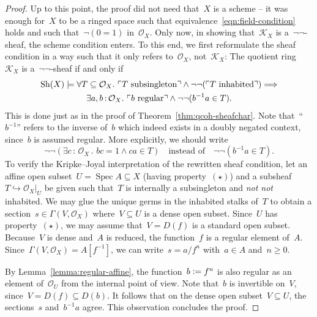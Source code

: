 \documentclass[10pt]{amsart}
\theoremstyle{definition}
\theoremstyle{plain}
\theoremstyle{remark}
\renewcommand{\O}{\mathcal{O}}
\newcommand{\K}{\mathcal{K}}
\newcommand{\Sh}{\mathrm{Sh}}
\DeclareMathOperator{\Spec}{Spec}
\newcommand{\?}{\,{:}\,}
\renewcommand{\_}{\mathpunct{.}\,}
\newcommand{\speak}[1]{\ulcorner\text{\textnormal{#1}}\urcorner}
\newcommand{\notnot}{\emph{not not}\xspace}
\newcommand{\defeq}{\vcentcolon=}
\begin{document}
\begin{proof}
Up to this point, the proof did not need that~$X$ is a scheme -- it was enough
for~$X$ to be a ringed space such that equivalence~\eqref{eqn:field-condition} holds and
such that~$\neg(0 = 1)$ in~$\O_X$. Only now, in showing that~$\K_X$ is
a~$\neg\neg$-sheaf, the scheme condition enters. To this end, we first
reformulate the sheaf condition in a way such that it only refers to~$\O_X$,
not~$\K_X$: The quotient ring~$\K_X$ is a~$\neg\neg$-sheaf if and only if
\begin{multline*}
  \Sh(X) \models \forall T \subseteq \O_X\_
  \speak{$T$ subsingleton} \wedge \neg\neg(\speak{$T$ inhabited})
  \Longrightarrow \\
  \exists a,b\?\O_X\_ \speak{$b$ regular} \wedge \neg\neg(b^{-1} a \in T).
\end{multline*}
This is done just as in the proof of Theorem~\ref{thm:qcoh-sheafchar}. Note
that~``$b^{-1}$'' refers to the inverse of~$b$ which indeed exists in a doubly
negated context, since~$b$ is assumed regular. More explicitly, we should write
\[ \neg\neg(\exists c\?\O_X\_ bc = 1 \wedge ca \in T)
  \quad\text{instead of}\quad
  \neg\neg(b^{-1} a \in T). \]
To verify the Kripke--Joyal interpretation of the rewritten sheaf condition, let
an affine open subset~$U = \Spec A \subseteq X$ (having property~$(\star)$) and a subsheaf~$T
\hookrightarrow \O_X|_U$ be given such that~$T$ is internally a subsingleton
and \notnot inhabited. We may glue the unique germs in the inhabited
stalks of~$T$ to obtain a section~$s \in \Gamma(V,\O_X)$ where~$V \subseteq U$
is a dense open subset. Since~$U$ has property~$(\star)$, we may assume that~$V
= D(f)$ is a standard open subset. Because~$V$ is dense and~$A$ is reduced, the
function~$f$ is a regular element of~$A$.
Since~$\Gamma(V,\O_X) = A[f^{-1}]$, we can write~$s = a/f^n$ with~$a \in A$
and~$n \geq 0$.

By Lemma~\ref{lemma:regular-affine}, the function~$b \defeq f^n$ is also regular as an
element of~$\O_U$ from the internal point of view. Note that~$b$ is invertible
on~$V$, since~$V = D(f) \subseteq D(b)$. It follows that on the dense
open subset~$V \subseteq U$, the sections~$s$ and~$b^{-1} a$ agree.
This observation concludes the proof.
\end{proof}
\end{document}
